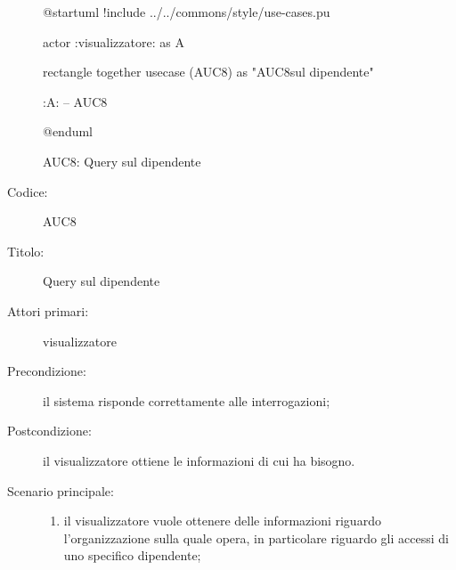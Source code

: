 \documentclass[../../../analisi-dei-requisiti.tex]{subfiles}
\begin{document}
\begin{figure}[h!]
  \centering
  \begin{plantuml}
  @startuml
  !include ../../commons/style/use-cases.pu

  actor :visualizzatore: as A

  rectangle {
    together {
      usecase (AUC8) as "AUC8\nQuery sul dipendente"
    }
  }

  :A: -- AUC8

  @enduml
  \end{plantuml}
  \caption{AUC8: Query sul dipendente}
  \label{fig:AUC8}
\end{figure}

\begin{description}
  \item[Codice:] AUC8
  \item[Titolo:] Query sul dipendente
  \item[Attori primari:] visualizzatore
  \item[Precondizione:] il sistema risponde correttamente alle interrogazioni;
  \item[Postcondizione:] il visualizzatore ottiene le informazioni di cui ha bisogno.
  \item[Scenario principale:]
  \begin{enumerate}
    \item il visualizzatore vuole ottenere delle informazioni riguardo l'organizzazione sulla quale opera, in particolare riguardo gli accessi di uno specifico dipendente;
  \end{enumerate}
\end{description}
\end{document}

